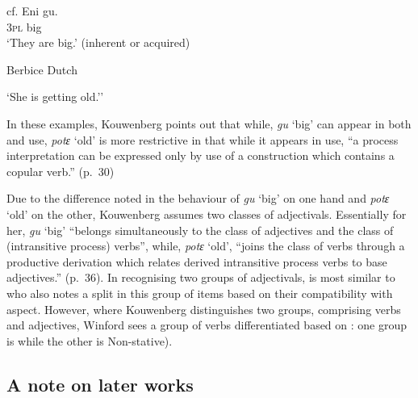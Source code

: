 cf.
\gll        Eni gu.\\
	\textsc{3pl} big \\
\glt      `They are big.' (inherent or acquired) \z \z

\ea%
\label{ex:3:14}

Berbice Dutch\\

\glt `She is getting old.''  \z \z %

In these examples, Kouwenberg points out that while, \textit{gu} `big'
can appear in both  and  use, \textit{potɛ}
 `old' is more restrictive in that while it appears in  use,
``a process interpretation can be expressed only by use of a
construction which contains a copular verb.” (p.~30)

Due to the difference noted in the behaviour of \textit{gu} `big' on
one hand and \textit{potɛ} `old' on the other, Kouwenberg assumes two
classes of adjectivals. Essentially for her, \textit{gu} `big'
``belongs simultaneously to the class of adjectives and the class of
(intransitive process) verbs”, while, \textit{potɛ} `old', “joins
the class of verbs through a productive derivation which relates
derived intransitive process verbs to base adjectives.” (p.~36).  In
recognising two groups of adjectivals, \citet{Kouwenberg1996} is most
similar to \citet{Winford1993} who also notes a split in this group of
items based on their compatibility with  aspect.  However,
where Kouwenberg distinguishes two groups, comprising verbs and
adjectives, Winford sees a group of verbs differentiated based on
: one group is  while the other is Non-stative).

\subsection{ A note on later works}\label{sec:3.1.3}

